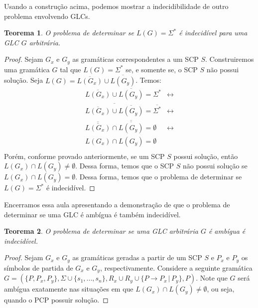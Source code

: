 \documentclass[a4paper]{article}
\newtheorem{Theorem}{Teorema}
\theoremstyle{definition}
\begin{document}
    Usando a construção acima, podemos mostrar a indecidibilidade de outro
    problema envolvendo GLCs.

    \begin{Theorem}
      O problema de determinar se $L(G) = \Sigma^*$ é indecidível para uma
      GLC $G$ arbitrária.
    \end{Theorem}
    \begin{proof}
      Sejam $G_x$ e $G_y$ as gramáticas correspondentes a um SCP $S$.
      Construiremos uma gramática $G$ tal que $L(G) = \Sigma^*$ se, e somente
      se, o SCP $S$ não possui solução. Seja $L(G) = \overline{L(G_x)} \cup
      \overline{L(G_y)}$. Temos:
      \[
        \begin{array}{lc}
          \overline{L(G_x)} \cup \overline{L(G_y)} = \Sigma^* & \leftrightarrow \\
          \overline{\overline{L(G_x)} \cup \overline{L(G_y)}} =
          \overline{\Sigma^*} & \leftrightarrow \\
          \overline{\overline{L(G_x)}} \cap \overline{\overline{L(G_y)}} =
          \emptyset & \leftrightarrow \\
          L(G_x) \cap L(G_y) = \emptyset & \\
        \end{array}
      \]
      Porém, conforme provado anteriormente, se um SCP $S$ possui solução, então
      $L(G_x) \cap L(G_y) \neq \emptyset$. Dessa forma, temos que o SCP $S$ não
      possui solução se $L(G_x) \cap L(G_y) = \emptyset$. Dessa forma, temos que
      o problema de determinar se $L(G) = \Sigma^*$ é indecidível. 
    \end{proof}

    Encerramos essa aula apresentando a demonstração de que o problema de
    determinar se uma GLC é ambígua é também indecidível.

    \begin{Theorem}
      O problema de determinar se uma GLC arbitrária $G$ é ambígua é
      indecidível.
    \end{Theorem}
    \begin{proof}
      Sejam $G_x$ e $G_y$ as gramáticas geradas a partir de um SCP $S$ e $P_x$ e
      $P_y$ os símbolos de partida de $G_x$ e $G_y$, respectivamente.
      Considere a seguinte gramática $G = (\{P,P_x,P_y\},
      \Sigma\cup\{s_1,...,s_n\},R_x \cup R_y \cup \{P \to P_x \,|\, P_y\}, P)$.
      Note que $G$ será ambígua exatamente nas situações em que $L(G_x) \cap
      L(G_y) \neq \emptyset$, ou seja, quando o PCP possuir solução.
    \end{proof}
\end{document}
